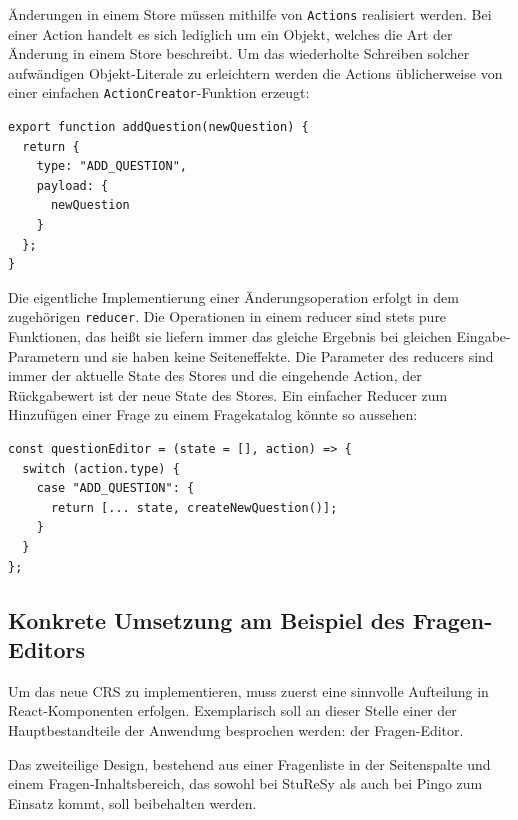 Änderungen in einem Store müssen mithilfe von \texttt{Actions} realisiert werden. Bei einer Action handelt es sich lediglich um ein Objekt, welches die Art der Änderung in einem Store beschreibt. Um das wiederholte Schreiben solcher aufwändigen Objekt-Literale zu erleichtern werden die Actions üblicherweise von einer einfachen \texttt{ActionCreator}-Funktion erzeugt:

\begin{minipage}{\linewidth}
\begin{lstlisting}[caption={Ein Action-Objekt ist lediglich die Beschreibung einer Änderungsoperation und wird in einem ActionCreator erzeugt.}]
export function addQuestion(newQuestion) {
  return {
    type: "ADD_QUESTION",
    payload: {
      newQuestion
    }
  };
}
\end{lstlisting}
\end{minipage}

Die eigentliche Implementierung einer Änderungsoperation erfolgt in dem zugehörigen \texttt{reducer}. Die Operationen in einem reducer sind stets pure Funktionen, das heißt sie liefern immer das gleiche Ergebnis bei gleichen Eingabe-Parametern und sie haben keine Seiteneffekte. Die Parameter des reducers sind immer der aktuelle State des Stores und die eingehende Action, der Rückgabewert ist der neue State des Stores. Ein einfacher Reducer zum Hinzufügen einer Frage zu einem Fragekatalog könnte so aussehen:

\begin{minipage}{\linewidth}
\begin{lstlisting}[caption={In einem Reducer werden die Änderungsoperationen eines Stores als pure Funktion implementiert.}]
const questionEditor = (state = [], action) => {
  switch (action.type) {
    case "ADD_QUESTION": {
      return [... state, createNewQuestion()];
    }
  }
};
\end{lstlisting}
\end{minipage}

\subsection{Konkrete Umsetzung am Beispiel des Fragen-Editors}
Um das neue CRS zu implementieren, muss zuerst eine sinnvolle Aufteilung in React-Komponenten erfolgen. Exemplarisch soll an dieser Stelle einer der Hauptbestandteile der Anwendung besprochen werden: der Fragen-Editor.

Das zweiteilige Design, bestehend aus einer Fragenliste in der Seitenspalte und einem Fragen-Inhaltsbereich, das sowohl bei StuReSy als auch bei Pingo zum Einsatz kommt, soll beibehalten werden.

